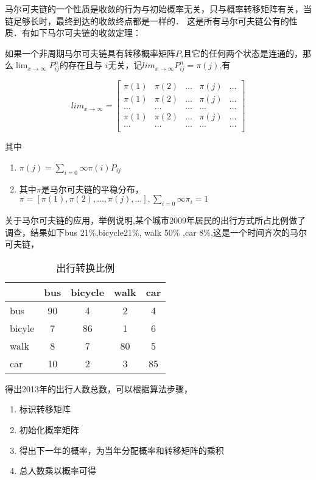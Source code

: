     马尔可夫链的一个性质是收敛的行为与初始概率无关，只与概率转移矩阵有关，当链足够长时，最终到达的收敛终点都是一样的．
这是所有马尔可夫链公有的性质．有如下马尔可夫链的收敛定理：
    
    如果一个非周期马尔可夫链具有转移概率矩阵$P$,且它的任何两个状态是连通的，那么$\lim_{x\to\infty} P_{ij}^{n}$的存在且与
$i$无关，记$lim_{x\to\infty} P_{ij}^{n}=\pi(j)$,有

    \begin{displaymath}
        lim_{x\to\infty} = \left[
\begin{array}{ccccc}
\pi(1) & \pi(2) & \ldots & \pi(j) & \ldots \\
\pi(1) & \pi(2) &  \ldots & \pi(j) & \ldots \\
 \ldots& \ldots& \ldots& \ldots& \ldots \\
\pi(1) & \pi(2) &  \ldots & \pi(j) & \ldots \\
 \ldots& \ldots& \ldots& \ldots& \ldots \\
\end{array} \right]
    \end{displaymath}

    其中
    \begin{enumerate}
    \item $\pi(j)=\sum_{i=0}{\infty}\pi(i)P_{ij}$
    \item 其中$\pi$是马尔可夫链的平稳分布，$\pi = [\pi(1),\pi(2),\ldots,\pi(j),\ldots],\sum_{i=0}{\infty}\pi_i=1$
    \end{enumerate}

    关于马尔可夫链的应用，举例说明,某个城市2009年居民的出行方式所占比例做了调查，结果如下bus 21\%,bicycle21\%,
walk 50\% ,car 8\%,这是一个时间齐次的马尔可夫链，

    \begin{table}[htbp]
    \centering  %
    \begin{tabular}{lcccc}  %
    \hline
    &bus&bicycle&walk&car\\ \hline  %
    bus&90&4&2&4\\
    bicyle&7&86&1&6\\
    walk&8&7&80&5\\
    car&10&2&3&85\\ \hline
    \end{tabular}
    \caption{出行转换比例}
    \end{table}
    
    得出2013年的出行人数总数，可以根据算法步骤，
    \begin{enumerate}
    \item 标识转移矩阵
    \item 初始化概率矩阵
    \item 得出下一年的概率，为当年分配概率和转移矩阵的乘积
    \item 总人数乘以概率可得
    \end{enumerate}

